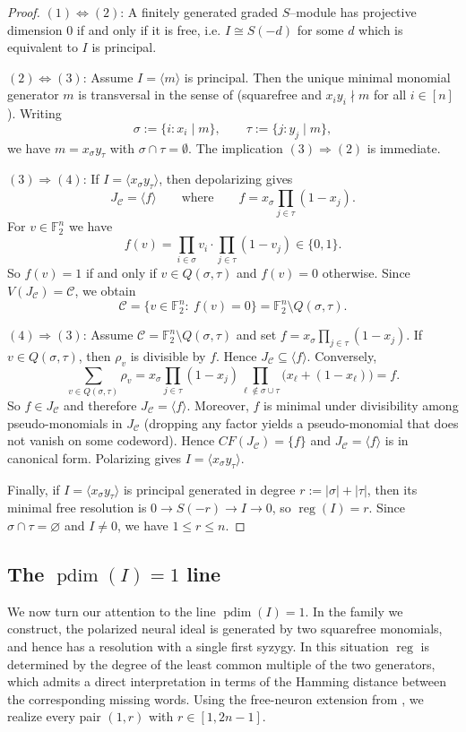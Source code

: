 \documentclass[12pt]{amsart}
\theoremstyle{remark}
\theoremstyle{definition}
\DeclareMathOperator{\reg}{reg}
\DeclareMathOperator{\pd}{pdim}
\newcommand{\F}{\mathbb{F}}
\newcommand{\C}{\mathcal{C}}
\begin{document}
\begin{proof}
$(1)\Leftrightarrow(2)$:
A finitely generated graded $S$--module has projective dimension $0$ if and only if it is free, i.e. $I\cong S(-d)$ for some $d$ which is equivalent to  $I$ is principal.


$(2)\Leftrightarrow(3)$:
Assume $I=\langle m\rangle$ is principal.
Then the unique minimal monomial generator $m$  is transversal in the sense of  (squarefree and $x_i y_i\nmid m$ for all $i\in[n]$).
Writing
\[
\sigma:=\{i : x_i \mid m\},\qquad \tau:=\{j : y_j \mid m\},
\]
we have $m=x_\sigma y_\tau$ with $\sigma\cap\tau=\emptyset$.
The implication $(3)\Rightarrow(2)$ is immediate.


$(3)\Rightarrow(4)$:
If $I=\langle x_\sigma y_\tau\rangle$, then depolarizing gives
\[
J_\C=\langle f\rangle
\qquad\text{where}\qquad
f=x_\sigma\prod_{j\in\tau}(1-x_j).
\]
For $v\in\F_2^n$ we have
\[
f(v)=\prod_{i\in\sigma} v_i \cdot \prod_{j\in\tau} (1-v_j)\in\{0,1\}.
\]
So $f(v)=1$ if and only if $v\in Q(\sigma,\tau)$ and $f(v)=0$ otherwise. Since $V(J_\C)=\C$,
we obtain
\[
\C=\{v\in\F_2^n:\ f(v)=0\}=\F_2^n\setminus Q(\sigma,\tau).
\]

$(4)\Rightarrow(3)$:
Assume $\C=\F_2^n\setminus Q(\sigma,\tau)$ and set $f=x_\sigma\prod_{j\in\tau}(1-x_j)$.
If $v\in Q(\sigma,\tau)$, then $\rho_v$ is divisible by $f$.  Hence $J_\C\subseteq\langle f\rangle$.
Conversely,
\[
\sum_{v\in Q(\sigma,\tau)} \rho_v
=
x_\sigma\prod_{j\in\tau}(1-x_j)\prod_{\ell\notin\sigma\cup\tau}\bigl(x_\ell+(1-x_\ell)\bigr)
=f.
\]
So $f\in J_\C$ and therefore $J_\C=\langle f\rangle$.
Moreover, $f$ is minimal under divisibility among pseudo-monomials in $J_\C$ (dropping any factor yields a
pseudo-monomial that does not vanish on some codeword). Hence $CF(J_\C)=\{f\}$ and $J_\C=\langle f\rangle$ is in canonical form.
Polarizing gives $I=\langle x_\sigma y_\tau\rangle$.

Finally, if $I=\langle x_\sigma y_\tau\rangle$ is principal generated in degree
$r:=|\sigma|+|\tau|$, then its minimal free resolution is $0\to S(-r)\to I\to 0$, so $\reg(I)=r$.
Since $\sigma\cap\tau=\varnothing$ and $I\neq 0$, we have $1\le r\le n$.
\end{proof}



\subsection{The $\pd (I)=1$ line}\label{sec:pdim1}
We now turn our attention to the line $\pd (I)=1$.  In the  family we construct, the polarized neural ideal is generated by two
squarefree monomials, and hence has a resolution with a single first syzygy.  In this situation
$\reg$ is determined by the degree of the least common multiple of the two generators, which admits
a direct interpretation in terms of the Hamming distance between the corresponding missing words.
Using the free-neuron extension from , we realize every pair
$(1,r)$ with $r\in [1, 2n-1]$.
\end{document}
